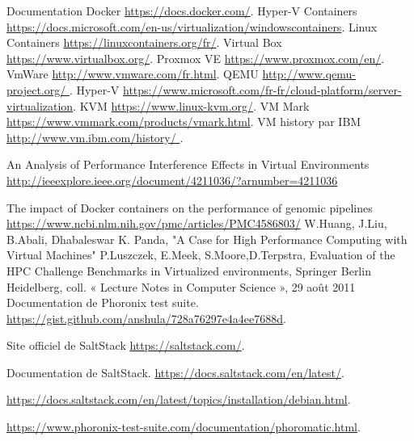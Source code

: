 \documentclass[a4paper]{report}
\begin{document}
\newpage
\begin{thebibliography}{9}

          Documentation Docker
          \url{https://docs.docker.com/}.
          Hyper-V Containers
          \url{https://docs.microsoft.com/en-us/virtualization/windowscontainers}.
         Linux Containers
         \url{https://linuxcontainers.org/fr/}.
         Virtual Box
         \url{ https://www.virtualbox.org/}.
         Proxmox VE
         \url{https://www.proxmox.com/en/}.
         VmWare
         \url{ http://www.vmware.com/fr.html}.
         QEMU
         \url{http://www.qemu-project.org/   }.
         Hyper-V
         \url{https://www.microsoft.com/fr-fr/cloud-platform/server-virtualization}.      
         KVM
         \url{https://www.linux-kvm.org/}.
         VM Mark
         \url{https://www.vmmark.com/products/vmark.html}. 
         VM history par IBM
         \url{http://www.vm.ibm.com/history/ }.
 
          An Analysis of Performance Interference Effects in Virtual Environments
          \url{http://ieeexplore.ieee.org/document/4211036/?arnumber=4211036}
      
          The impact of Docker containers on the performance of genomic pipelines
          \url {https://www.ncbi.nlm.nih.gov/pmc/articles/PMC4586803/}              
          W.Huang, J.Liu, B.Abali, Dhabaleswar K. Panda, "A Case for High Performance Computing with Virtual Machines"     
          P.Luszczek, E.Meek, S.Moore,D.Terpstra, Evaluation of the HPC Challenge Benchmarks in Virtualized environments, Springer Berlin Heidelberg, coll. « Lecture Notes in Computer Science », 29 août 2011 
        Documentation de Phoronix test suite.
          \url{https://gist.github.com/anshula/728a76297e4a4ee7688d}.
          
        Site officiel de SaltStack
          \url{https://saltstack.com/}.

         Documentation de SaltStack.
          \url{https://docs.saltstack.com/en/latest/}.
          
       
          \url{https://docs.saltstack.com/en/latest/topics/installation/debian.html}.

       
          \url{https://www.phoronix-test-suite.com/documentation/phoromatic.html}.
\end{thebibliography}
\end{document}
